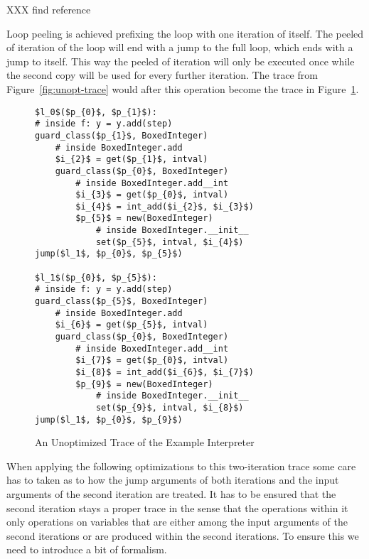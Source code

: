 \documentclass[preprint]{sigplanconf}
\begin{document}
XXX find reference

Loop peeling is achieved prefixing the loop with one iteration of itself. The
peeled of iteration of the loop will end with a jump to the full loop, which
ends with a jump to itself. This way the peeled of iteration will only be
executed once while the second copy will be used for every further iteration.
The trace from Figure~\ref{fig:unopt-trace} would after this operation become
the trace in Figure~\ref{fig:peeled-trace}.

\begin{figure}
\begin{lstlisting}[mathescape,numbers = right,basicstyle=\setstretch{1.05}\ttfamily\scriptsize]
$l_0$($p_{0}$, $p_{1}$):
# inside f: y = y.add(step)
guard_class($p_{1}$, BoxedInteger)
    # inside BoxedInteger.add
    $i_{2}$ = get($p_{1}$, intval)
    guard_class($p_{0}$, BoxedInteger)
        # inside BoxedInteger.add__int
        $i_{3}$ = get($p_{0}$, intval)
        $i_{4}$ = int_add($i_{2}$, $i_{3}$)
        $p_{5}$ = new(BoxedInteger)
            # inside BoxedInteger.__init__
            set($p_{5}$, intval, $i_{4}$)
jump($l_1$, $p_{0}$, $p_{5}$)

$l_1$($p_{0}$, $p_{5}$):
# inside f: y = y.add(step)
guard_class($p_{5}$, BoxedInteger)
    # inside BoxedInteger.add
    $i_{6}$ = get($p_{5}$, intval)
    guard_class($p_{0}$, BoxedInteger)
        # inside BoxedInteger.add__int
        $i_{7}$ = get($p_{0}$, intval)
        $i_{8}$ = int_add($i_{6}$, $i_{7}$)
        $p_{9}$ = new(BoxedInteger)
            # inside BoxedInteger.__init__
            set($p_{9}$, intval, $i_{8}$)
jump($l_1$, $p_{0}$, $p_{9}$)
\end{lstlisting}
\caption{An Unoptimized Trace of the Example Interpreter}
\label{fig:peeled-trace}
\end{figure}

When applying the following optimizations to this two-iteration trace
some care has to taken as to how the jump arguments of both
iterations and the input arguments of the second iteration are
treated. It has to be ensured that the second iteration stays a proper
trace in the sense that the operations within it only operations on
variables that are either among the input arguments of the second iterations
or are produced within the second iterations. To ensure this we need
to introduce a bit of formalism. 
\end{document}
